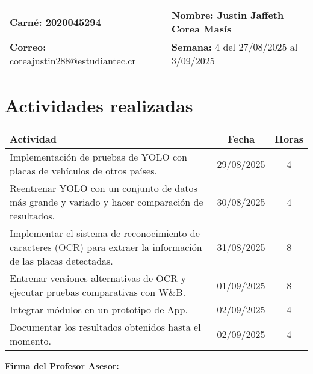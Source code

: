 \documentclass[12pt,a4paper]{article}
\begin{document}
\noindent
\begin{tabularx}{\textwidth}{|X|X|}
\hline
\textbf{Carné:} 2020045294 & \textbf{Nombre:} Justin Jaffeth Corea Masís \\
\hline
\textbf{Correo:} coreajustin288@estudiantec.cr & \textbf{Semana:} 4 del 27/08/2025 al 3/09/2025 \\
\hline
\end{tabularx}

\vspace{0.5cm}

\section*{Actividades realizadas}

\begin{tabularx}{\textwidth}{|>{\raggedright\arraybackslash}p{12cm}|c|c|}
\hline
\textbf{Actividad} & \textbf{Fecha} & \textbf{Horas} \\
\hline
	Implementación de pruebas de YOLO con placas de vehículos de otros países. & 29/08/2025 & 4 \\
\hline
	Reentrenar YOLO con un conjunto de datos más grande y variado y hacer comparación de resultados. & 30/08/2025 & 4 \\
\hline
	Implementar el sistema de reconocimiento de caracteres (OCR)
	para extraer la información de las placas detectadas. & 31/08/2025 & 8 \\
\hline
	Entrenar versiones alternativas de OCR y ejecutar pruebas comparativas con W\&B. & 01/09/2025 & 8 \\
\hline
	Integrar módulos en un prototipo de App. & 02/09/2025 & 4 \\
\hline
	Documentar los resultados obtenidos hasta el momento. & 02/09/2025 & 4 \\
\hline
\end{tabularx}

\vspace{1cm}

\noindent
\textbf{Firma del Profesor Asesor:}

\vspace{2cm}
\end{document}
